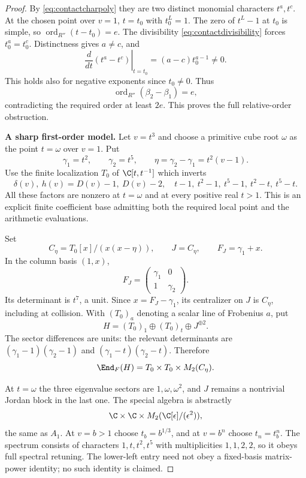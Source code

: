 \documentclass[11pt,a4paper]{article}
\theoremstyle{named}\newtheorem{finding}{Finding}[section]
\theoremstyle{definition}\newtheorem{definition}[finding]{Definition}
\theoremstyle{remark}\newtheorem{remark}[finding]{Remark}
\begin{document}
\begin{proof}
By \eqref{eq:contactcharpoly} they are two distinct
monomial characters $t^a,t^c$.
At the chosen point over $v=1$, $t=t_0$ with
$t_0^L=1$. The zero of $t^L-1$ at $t_0$ is simple,
so $\operatorname{ord}_{R''}(t-t_0)=e$.
The divisibility \eqref{eq:contactdivisibility}
forces $t_0^a=t_0^c$.
Distinctness gives $a\ne c$, and
\[
 \left.\frac{d}{dt}(t^a-t^c)\right|_{t=t_0}
       =(a-c)t_0^{a-1}\ne0.
\]
This holds also for negative exponents since
$t_0\ne0$. Thus
\[
 \operatorname{ord}_{R''}(\beta_2-\beta_1)=e,
\]
contradicting the required order at least $2e$.
This proves the full relative-order obstruction.

\par\smallskip\noindent\textbf{A sharp first-order model.}\quad
Let $v=t^3$ and choose a primitive cube root $\omega$
as the point $t=\omega$ over $v=1$. Put
\[
 \gamma_1=t^2,\qquad \gamma_2=t^5,\qquad
 \eta=\gamma_2-\gamma_1=t^2(v-1).
\]
Use the finite localization $T_0$ of $\C[t,t^{-1}]$
which inverts
\[
 \delta(v),\ h(v)=D(v)-1,\ D(v)-2,\quad
 t-1,\ t^2-1,\ t^5-1,\ t^2-t,\ t^5-t.
\]
All these factors are nonzero at $t=\omega$ and
at every positive real $t>1$.
This is an explicit finite coefficient base admitting
both the required local point and the arithmetic
evaluations.

Set
\[
 C_\eta=T_0[x]/(x(x-\eta)),\qquad
 J=C_\eta,\qquad F_J=\gamma_1+x.
\]
In the column basis $(1,x)$,
\[
 F_J=\begin{pmatrix}\gamma_1&0\\1&\gamma_2\end{pmatrix}.
\]
Its determinant is $t^7$, a unit.
Since $x=F_J-\gamma_1$, its centralizer on $J$ is
$C_\eta$, including at collision.
With $(T_0)_a$ denoting a scalar line of Frobenius $a$,
put
\[
 H=(T_0)_1\oplus(T_0)_t\oplus J^{\oplus2}.
\]
The sector differences are units:
the relevant determinants are
$(\gamma_1-1)(\gamma_2-1)$ and
$(\gamma_1-t)(\gamma_2-t)$.
Therefore
\begin{equation}\label{eq:firstordercentralizer}
 \End_F(H)=T_0\times T_0\times M_2(C_\eta).
\end{equation}

At $t=\omega$ the three eigenvalue sectors are
$1,\omega,\omega^2$, and $J$ remains a nontrivial
Jordan block in the last one.
The special algebra is abstractly
\[
 \C\times\C\times M_2(\C[\epsilon]/(\epsilon^2)),
\]
the same as $A_1$.
At $v=b>1$ choose $t_b=b^{1/3}$, and at $v=b^n$
choose $t_n=t_b^n$.
The spectrum consists of characters $1,t,t^2,t^5$
with multiplicities $1,1,2,2$, so it obeys full
spectral retuning.
The lower-left entry need not obey a fixed-basis
matrix-power identity; no such identity is claimed.


\end{proof}
\end{document}
